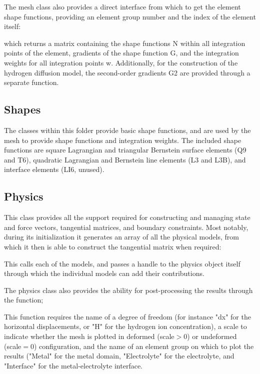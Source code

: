 \documentclass[3p]{elsarticle} %
\begin{document}
The mesh class also provides a direct interface from which to get the element shape functions, providing an element group number and the index of the element itself:

which returns a matrix containing the shape functions N within all integration points of the element, gradients of the shape function G, and the integration weights for all integration points w. Additionally, for the construction of the hydrogen diffusion model, the second-order gradients G2 are provided through a separate function.

\subsection{Shapes}
The classes within this folder provide basic shape functions, and are used by the mesh to provide shape functions and integration weights. The included shape functions are square Lagrangian and triangular Bernstein surface elements (Q9 and T6), quadratic Lagrangian and Bernstein line elements (L3 and L3B), and interface elements (LI6, unused).

\subsection{Physics}
This class provides all the support required for constructing and managing state and force vectors, tangential matrices, and boundary constraints. Most notably, during its initialization it generates an array of all the physical models, from which it then is able to construct the tangential matrix when required:

This calls each of the models, and passes a handle to the physics object itself through which the individual models can add their contributions. 

The physics class also provides the ability for post-processing the results through the function;

This function requires the name of a degree of freedom (for instance "dx" for the horizontal displacements, or "H" for the hydrogen ion concentration), a scale to indicate whether the mesh is plotted in deformed (scale$>$0) or undeformed (scale$=$0) configuration, and the name of an element group on which to plot the results ("Metal" for the metal domain, "Electrolyte" for the electrolyte, and "Interface" for the metal-electrolyte interface.
\end{document}

